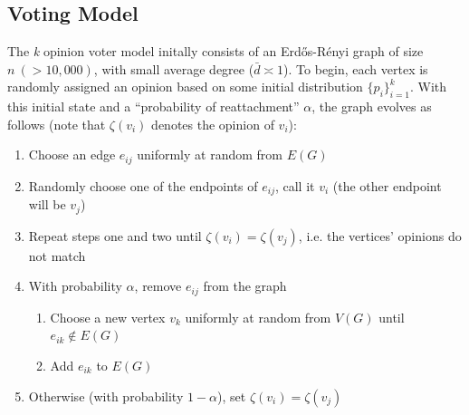 \documentclass[11pt]{article}
\begin{document}
\subsection{Voting Model}
\indent The \textit{k} opinion voter model initally consists of an Erd\H{o}s-R\'{e}nyi graph of size $n \ (>10,000)$, with small average degree ($\bar{d}\asymp 1$). To begin, each vertex is randomly assigned an opinion based on some initial distribution $\{p_{i}\}_{i=1}^{k}$. With this initial state and a ``probability of reattachment'' $\alpha$, the graph evolves as follows (note that $\zeta(v_{i})$ denotes the opinion of $v_{i}$):
\begin{enumerate}
\item Choose an edge $e_{ij}$ uniformly at random from $E(G)$
\item Randomly choose one of the endpoints of $e_{ij}$, call it $v_{i}$ (the other endpoint will be $v_{j}$)
\item Repeat steps one and two until $\zeta(v_{i}) = \zeta(v_{j})$, i.e. the vertices' opinions do not match
\item With probability $\alpha$, remove $e_{ij}$ from the graph
\begin{enumerate}
\item Choose a new vertex $v_{k}$ uniformly at random from $V(G)$ until $e_{ik} \notin E(G)$ 
\item Add $e_{ik}$ to $E(G)$
\end{enumerate}
\item Otherwise (with probability $1-\alpha$), set $\zeta(v_{i}) = \zeta(v_{j})$
\end{enumerate}
\end{document}
